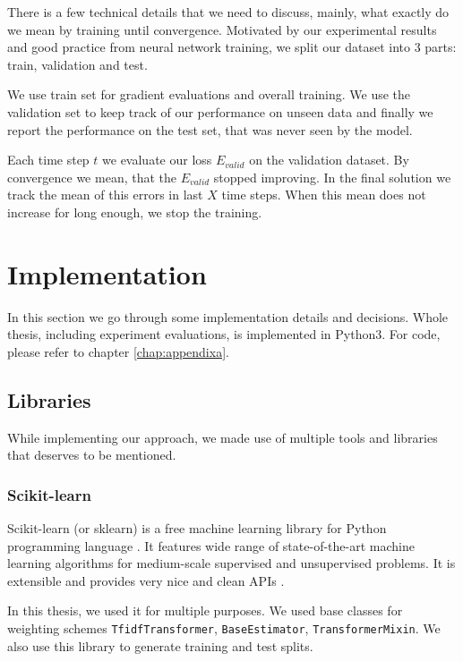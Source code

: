     There is a few technical details that we need to discuss, 
    mainly, what exactly do we mean by training until convergence.
    Motivated by our experimental results and good practice from neural network training,
    we split our dataset into $3$ parts: train, validation and test.
    
    We use train set for gradient evaluations and overall training. 
    We use the validation set to keep track of our performance on unseen data and finally we report the performance on the test set, that was never seen by the model.
    
    Each time step $t$ we evaluate our loss $E_{valid}$ on the validation dataset.
    By convergence we mean, that the $E_{valid}$ stopped improving.
    In the final solution we track the mean of this errors in last $X$ \* %
    time steps.
    When this mean does not increase for long enough, we stop the training.

\section{Implementation}
    
    In this section we go through some implementation details and decisions.
    Whole thesis, including experiment evaluations, is implemented in Python3.
    For code, please refer to chapter \ref{chap:appendixa}.

    \subsection{Libraries} 

    While implementing our approach, we made use of multiple tools and libraries that deserves to be mentioned.

    \subsubsection{Scikit-learn}
    
    Scikit-learn (or sklearn) is a free machine learning library for Python programming language \cite{scikit-learn}.
    It features wide range of state-of-the-art machine learning algorithms for medium-scale supervised and unsupervised problems.
    It is extensible and provides very nice and clean APIs \cite{sklearn_api}.
    
    In this thesis, we used it for multiple purposes.
    We used base classes for weighting schemes \texttt{TfidfTransformer}, \texttt{BaseEstimator}, \texttt{TransformerMixin}.
    We also use this library to generate training and test splits. 
    
